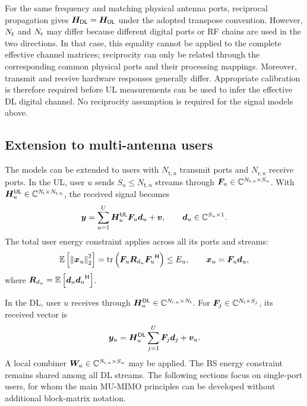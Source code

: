 For the same frequency and matching physical antenna ports, reciprocal propagation gives $\bm{H}_{\mathsf{DL}}=\bm{H}_{\mathsf{UL}}$ under the adopted transpose convention. However, $N_{\mathsf{t}}$ and $N_{\mathsf{r}}$ may differ because different digital ports or RF chains are used in the two directions. In that case, this equality cannot be applied to the complete effective channel matrices; reciprocity can only be related through the corresponding common physical ports and their processing mappings. Moreover, transmit and receive hardware responses generally differ. Appropriate calibration is therefore required before UL measurements can be used to infer the effective DL digital channel. No reciprocity assumption is required for the signal models above.

\subsection{Extension to multi-antenna users}
The models can be extended to users with $N_{\mathsf t,u}$ transmit ports and $N_{\mathsf r,u}$ receive ports. In the UL, user $u$ sends $S_u\leq N_{\mathsf t,u}$ streams through $\bm{F}_u\in\mathbb{C}^{N_{\mathsf t,u}\times S_u}$. With $\bm{H}_u^{\mathsf{UL}}\in\mathbb{C}^{N_{\mathsf{r}}\times N_{\mathsf t,u}}$, the received signal becomes
\begin{equation}
	\bm{y}=\sum_{u=1}^{U}\bm{H}_u^{\mathsf{UL}}\bm{F}_u\bm{d}_u+\bm{v},
	\qquad \bm{d}_u\in\mathbb{C}^{S_u\times1}.
	\label{eq:ulmultiuser}
\end{equation}
The total user energy constraint applies across all its ports and streams:
\begin{equation}
	\mathbb{E}\left[\left\|\bm{x}_u\right\|_2^2\right]
	=\operatorname{tr}\left(\bm{F}_u\bm{R}_{d_u}{\bm{F}_u}^{\mathsf{H}}\right)\leq E_u,
	\qquad \bm{x}_u=\bm{F}_u\bm{d}_u,
	\label{eq:ulmultiuserenergy}
\end{equation}
where $\bm{R}_{d_u}=\mathbb{E}\left[\bm{d}_u{\bm{d}_u}^{\mathsf{H}}\right]$.

In the DL, user $u$ receives through $\bm{H}_u^{\mathsf{DL}}\in\mathbb{C}^{N_{\mathsf r,u}\times N_{\mathsf{t}}}$. For $\bm{F}_j\in\mathbb{C}^{N_{\mathsf{t}}\times S_j}$, its received vector is
\begin{equation}
	\bm{y}_u=\bm{H}_u^{\mathsf{DL}}\sum_{j=1}^{U}\bm{F}_j\bm{d}_j+\bm{v}_u.
	\label{eq:dlmultiuser}
\end{equation}
A local combiner $\bm{W}_u\in\mathbb{C}^{N_{\mathsf r,u}\times S_u}$ may be applied. The BS energy constraint remains shared among all DL streams. The following sections focus on single-port users, for whom the main MU-MIMO principles can be developed without additional block-matrix notation.



